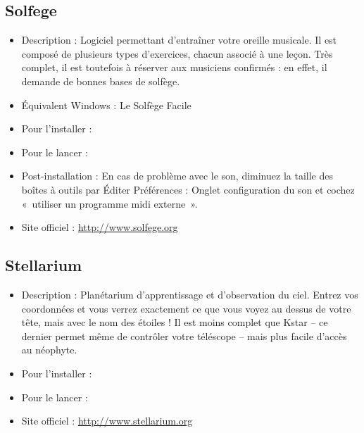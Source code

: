 \subsection{Solfege}
\begin{itemize}
\begingroup
{}
\item Description : Logiciel permettant d'entraîner votre oreille musicale. Il est composé de plusieurs types d'exercices, chacun associé à une leçon. Très complet, il est toutefois à réserver aux musiciens confirmés : en effet, il demande de bonnes bases de solfège.{\par}
\item Équivalent Windows : Le Solfège Facile{\par}
\item Pour l'installer : 
\item Pour le lancer : 
\endgroup
\item Post-installation : En cas de problème avec le son, diminuez la taille des boîtes à outils par Éditer \FlecheDroite Préférences : Onglet configuration du son et cochez «~utiliser un programme midi externe~».{\par}
\item Site officiel : \url{http://www.solfege.org}{\par}
\end{itemize}
\subsection{Stellarium}
\begin{itemize}
\begingroup
{}
\item Description : Planétarium d'apprentissage et d'observation du ciel. Entrez vos coordonnées et vous verrez exactement ce que vous voyez au dessus de votre tête, mais avec le nom des étoiles ! Il est moins complet que Kstar -- ce dernier permet même de contrôler votre téléscope -- mais plus facile d'accès au néophyte.{\par}
\item Pour l'installer : 
\item Pour le lancer : 
\item Site officiel : \url{http://www.stellarium.org}{\par}
\endgroup
\end{itemize}
